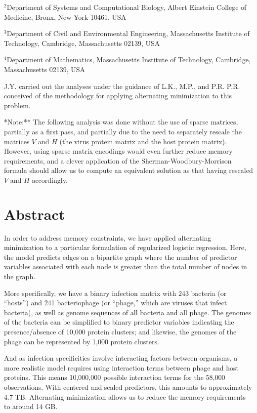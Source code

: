 \documentclass[12pt,twoside]{mitthesis-manusdown}
\begin{document}
\noindent \(^2\)Department of Systems and Computational Biology, Albert
Einstein College of Medicine, Bronx, New York 10461, USA

\noindent \(^3\)Department of Civil and Environmental Engineering,
Massachusetts Institute of Technology, Cambridge, Massachusetts 02139,
USA

\noindent \(^4\)Department of Mathematics, Massachusetts Institute of
Technology, Cambridge, Massachusetts 02139, USA \newline

\noindent J.Y. carried out the analyses under the guidance of L.K.,
M.P., and P.R. P.R. conceived of the methodology for applying
alternating minimization to this problem.

\doublespace
\newpage

\noindent **Note:** The following analysis was done without the use of
sparse matrices, partially as a first pass, and partially due to the
need to separately rescale the matrices \(V\) and \(H\) (the virus
protein matrix and the host protein matrix). However, using sparse
matrix encodings would even further reduce memory requirements, and a
clever application of the Sherman-Woodbury-Morrison formula should allow
us to compute an equivalent solution as that having rescaled \(V\) and
\(H\) accordingly.

\section{Abstract}\label{abstract-2}

In order to address memory constraints, we have applied alternating
minimization to a particular formulation of regularized logistic
regression. Here, the model predicts edges on a bipartite graph where
the number of predictor variables associated with each node is greater
than the total number of nodes in the graph.

More specifically, we have a binary infection matrix with 243 bacteria
(or ``hosts'') and 241 bacteriophage (or ``phage,'' which are viruses
that infect bacteria), as well as genome sequences of all bacteria and
all phage. The genomes of the bacteria can be simplified to binary
predictor variables indicating the presence/absence of 10,000 protein
clusters; and likewise, the genomes of the phage can be represented by
1,000 protein clusters.

And as infection specificities involve interacting factors between
organisms, a more realistic model requires using interaction terms
between phage and host proteins. This means 10,000,000 possible
interaction terms for the 58,000 observations. With centered and scaled
predictors, this amounts to approximately 4.7 TB. Alternating
minimization allows us to reduce the memory requirements to around 14
GB.
\end{document}
